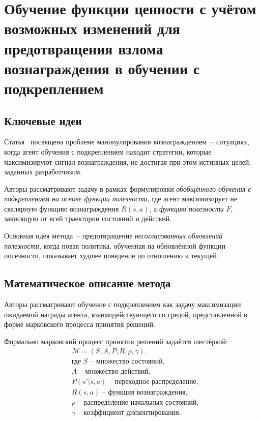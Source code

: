 \section{Обучение функции ценности с учётом возможных изменений для предотвращения взлома вознаграждения в обучении с подкреплением}

\subsection{Ключевые идеи}

Статья~\cite{opryshko2025modification} посвящена проблеме манипулирования вознаграждением~-- ситуациях, когда агент обучения с подкреплением находит стратегии, которые максимизируют сигнал вознаграждения, не достигая при этом истинных целей, заданных разработчиком.

Авторы рассматривают задачу в рамках формулировки \emph{обобщённого обучения с подкреплением на основе функции полезности}, где агент максимизирует не скалярную функцию вознаграждения $R(s, a)$, а \emph{функцию полезности} $F$, зависящую от всей траектории состояний и действий.

Основная идея метода~-- предотвращение \emph{несогласованных обновлений полезности}, когда новая политика, обученная на обновлённой функции полезности, показывает худшее поведение по отношению к текущей.


\subsection{Математическое описание метода}

Авторы рассматривают обучение с подкреплением как задачу максимизации ожидаемой награды агента, взаимодействующего со средой, представленной в форме марковского процесса принятия решений.

Формально марковский процесс принятия решений задаётся шестёркой:
\begin{equation}
\begin{aligned}
    &\mathcal{M} = (S, A, P, R, \rho, \gamma), \\
    &\text{где } S\text{~-- множество состояний,} \\
    &A\text{~-- множество действий,} \\
    &P(s'|s,a)\text{~-- переходное распределение,} \\
    &R(s, a)\text{~-- функция вознаграждения,} \\
    &\rho \text{~-- распределение начальных состояний,} \\
    &\gamma \text{~-- коэффициент дисконтирования.}
\end{aligned}
\end{equation}

